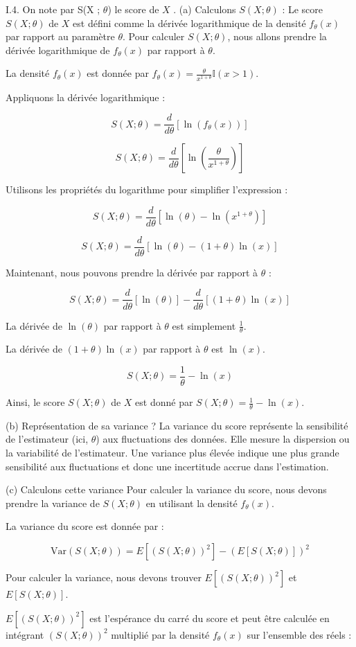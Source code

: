 \documentclass[11pt]{beamer}
\begin{document}
\begin{frame}{I.4. On note par  S(X ; $\theta$) le score de $X$ . }
	{(a) Calculons $S(X ; \theta)$ :}
	Le score $S(X ; \theta)$ de $X$ est défini comme la dérivée logarithmique de la densité $f_\theta(x)$ par rapport au paramètre $\theta$. Pour calculer $S(X ; \theta)$, nous allons prendre la dérivée logarithmique de $f_\theta(x)$ par rapport à $\theta$.
	
	La densité $f_\theta(x)$ est donnée par $f_\theta(x) = \frac{\theta}{x^{1+\theta}} \mathbb{I}(x > 1)$.
	
	Appliquons la dérivée logarithmique :
	
	\[ S(X ; \theta) = \frac{d}{d\theta} [\ln(f_\theta(x))] \]
	
	\[ S(X ; \theta) = \frac{d}{d\theta} [\ln\left(\frac{\theta}{x^{1+\theta}}\right)] \]	
\end{frame}
\begin{frame}
		Utilisons les propriétés du logarithme pour simplifier l'expression :
	
	\[ S(X ; \theta) = \frac{d}{d\theta} [\ln(\theta) - \ln(x^{1+\theta})] \]
	
	\[ S(X ; \theta) = \frac{d}{d\theta} [\ln(\theta) - (1+\theta)\ln(x)] \]
	
	Maintenant, nous pouvons prendre la dérivée par rapport à $\theta$ :
	
	\[ S(X ; \theta) = \frac{d}{d\theta} [\ln(\theta)] - \frac{d}{d\theta} [(1+\theta)\ln(x)] \]
	
	La dérivée de $\ln(\theta)$ par rapport à $\theta$ est simplement $\frac{1}{\theta}$.
	
	La dérivée de $(1+\theta)\ln(x)$ par rapport à $\theta$ est $\ln(x)$.
	
	\[ S(X ; \theta) = \frac{1}{\theta} - \ln(x) \]
	
	Ainsi, le score $S(X ; \theta)$ de $X$ est donné par $S(X ; \theta) = \frac{1}{\theta} - \ln(x)$.
	
\end{frame}
\begin{frame}{(b) Représentation de sa variance ?}
		 La variance du score représente la sensibilité de l'estimateur (ici, $\theta$) aux fluctuations des données. Elle mesure la dispersion ou la variabilité de l'estimateur. Une variance plus élevée indique une plus grande sensibilité aux fluctuations et donc une incertitude accrue dans l'estimation.
		
\end{frame}
\begin{frame}{(c) Calculons cette variance}
		 Pour calculer la variance du score, nous devons prendre la variance de $S(X ; \theta)$ en utilisant la densité $f_\theta(x)$.
	
	La variance du score est donnée par :
	
	\[ \text{Var}(S(X ; \theta)) = E[(S(X ; \theta))^2] - (E[S(X ; \theta)])^2 \]
	
	Pour calculer la variance, nous devons trouver $E[(S(X ; \theta))^2]$ et $E[S(X ; \theta)]$.
	
	$E[(S(X ; \theta))^2]$ est l'espérance du carré du score et peut être calculée en intégrant $(S(X ; \theta))^2$ multiplié par la densité $f_\theta(x)$ sur l'ensemble des réels :
\end{frame}
\end{document}
